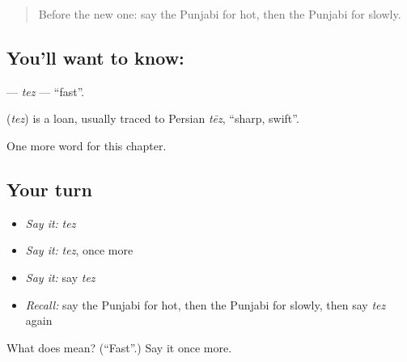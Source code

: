 \label{lesson:PA-C80-tez}



\begin{quote}
Before the new one: say the Punjabi for hot, then the Punjabi for slowly.
\end{quote}

\subsection*{You'll want to know: }
\textbf{} — \emph{tez} — \textquotedblleft{}fast\textquotedblright{}.

\begin{cousinweb}
\textbf{} (\emph{tez}) is a loan, usually traced to Persian \emph{tēz}, \textquotedblleft{}sharp, swift\textquotedblright{}.
\end{cousinweb}

\begin{grammarlens}[title={What you've built}]
One more word for this chapter.
\end{grammarlens}

\subsection*{Your turn}
\begin{itemize}
\raggedright
  \item \emph{Say it:} \emph{tez}
  \item \emph{Say it:} \emph{tez}, once more
  \item \emph{Say it:} say \emph{tez}
  \item \emph{Recall:} say the Punjabi for hot, then the Punjabi for slowly, then say \emph{tez} again
\end{itemize}

\begin{tcolorbox}[breakable,colback=teal!4,colframe=teal!35!black,title={Before you move on}]
What does  mean? (\textquotedblleft{}Fast\textquotedblright{}.) Say it once more.
\end{tcolorbox}

